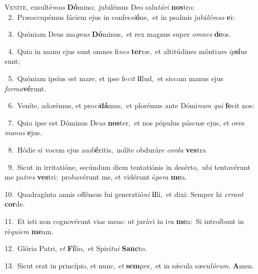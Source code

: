 \lettrine{\initial\textcolor{\initialcolor}{V}}{eníte,} exsulté\textit{mus} \textbf{Dó}\-mino;~\star jubilémus Deo salu\-\textit{tá}\-\textit{ri} \textbf{nos}\-tro;\\
{\numbfont\textcolor{\numbcolor}{~2.}}~Præoccupémus fáciem ejus in confes\-\textit{si}\-\textbf{ó}ne,~\star et in psalmis jubi\-\textit{lé}\-\textit{mus} \textbf{e}\-i:\par
{\numbfont\textcolor{\numbcolor}{~3.}}~Quóniam Deus ma\textit{gnus} \textbf{Dó}\-minus,~\star et rex magnus super \textit{om}\-\textit{nes} \textbf{de}\-os.\par
{\numbfont\textcolor{\numbcolor}{~4.}}~Quia in manu ejus sunt omnes fi\textit{nes} \textbf{ter}\-ræ,~\star et altitúdines mónti\textit{um} \textit{ip}\-\textbf{sí}us sunt;\par
{\numbfont\textcolor{\numbcolor}{~5.}}~Quóniam ipsíus est mare, et ipse fe\textit{cit} \textbf{il}\-lud,~\star et siccam manus ejus \textit{for}\-\textit{ma}\textbf{vé}runt.\par
{\numbfont\textcolor{\numbcolor}{~6.}}~Veníte, adorémus, et pro\-\textit{ci}\-\textbf{dá}mus,~\star et plorémus ante Dómi\textit{num} \textit{qui} \textbf{fe}\-cit nos:\par
{\numbfont\textcolor{\numbcolor}{~7.}}~Quia ipse est Dóminus De\textit{us} \textbf{nos}\-ter,~\star et nos pópulus páscuæ ejus, et oves \textit{ma}\-\textit{nus} \textbf{e}\-jus.\par
{\numbfont\textcolor{\numbcolor}{~8.}}~Hódie si vocem ejus au\-\textit{di}\-\textbf{é}ritis,~\star nolíte obduráre \textit{cor}\-\textit{da} \textbf{ves}\-tra\par
{\numbfont\textcolor{\numbcolor}{~9.}}~Sicut in irritatióne, secúndum diem tentatiónis in desérto,~\dagger ubi tentavérunt me pa\textit{tres} \textbf{ves}\-tri:~\star probavérunt me, et vidérunt ó\-\textit{pe}\-\textit{ra} \textbf{me}\-a.\par
{\numbfont\textcolor{\numbcolor}{10.}}~Quadragínta annis offénsus fui generatió\textit{ni} \textbf{il}\-li,~\star et dixi: Semper hi \textit{er}\-\textit{rant} \textbf{cor}\-de.\par
{\numbfont\textcolor{\numbcolor}{11.}}~Et isti non cognovérunt vias meas: ut jurávi in i\textit{ra} \textbf{me}\-a:~\star Si introíbunt in ré\-\textit{qui}\-\textit{em} \textbf{me}\-am.\par
{\numbfont\textcolor{\numbcolor}{12.}}~Glória Patri, \textit{et} \textbf{Fí}\-lio,~\star et Spirí\-\textit{tu}\-\textit{i} \textbf{Sanc}\-to.\par
{\numbfont\textcolor{\numbcolor}{13.}}~Sicut erat in princípio, et nunc, \textit{et} \textbf{sem}\-per,~\star et in sǽcula sæcu\-\textit{ló}\-\textit{rum}. \textbf{A}\-men.\par
